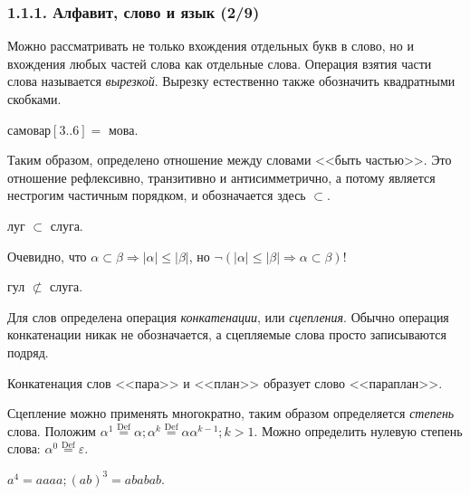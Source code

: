\documentclass[mathserif,12pt,aspectratio=169]{beamer}
\renewcommand{\index}[1]{}
\def\odmkey#1#2{{\it\color{red} #1}\index{#2}}
\def\Def{\stackrel{\text{Def}}{=}}
\let\Impl\Longrightarrow
\def\Not{\neg}
\let\le\leqslant
\begin{document}
\begin{frame}
\frametitle{1.1.1. Алфавит, слово и язык (2/9)}
Можно рассматривать не только вхождения
отдельных букв в слово, но и 
вхождения любых частей слова как отдельные слова.
Операция взятия части слова называется 
\odmkey{вырезкой}{Операция вырезки}.
Вырезку естественно также обозначить 
квадратными скобками. 
\begin{example}
самовар$[3..6]= $ мова.
\end{example}

Таким образом, определено отношение 
между словами <<быть частью>>.
Это отношение рефлексивно, транзитивно и антисимметрично,
а потому является нестрогим частичным порядком,
и обозначается здесь $\subset$.
\begin{example}
луг $\subset$ слуга.
\end{example}

\begin{remark} Очевидно, что 
$\alpha\subset\beta\Impl|\alpha|\le|\beta|$,
но $\Not(|\alpha|\le|\beta|\Impl\alpha\subset\beta)$!
\end{remark} 
\begin{example}
гул $\not\subset$ слуга.
\end{example}

Для слов определена операция 
\odmkey{конкатенации}{Операция!конкатенации}, 
или \odmkey{сцепления}{Операция!сцепления}.
Обычно операция конкатенации никак не обозначается, а сцепляемые слова 
просто записываются подряд. 

\begin{example}
Конкатенация слов <<пара>> и <<план>> образует слово <<параплан>>.
\end{example}

Сцепление можно применять многократно,
таким образом определяется \odmkey{степень}{Степень!слова} слова. Положим
$\alpha^1 \Def \alpha; \alpha^k\Def\alpha\alpha^{k-1}; k>1$. Можно 
определить нулевую степень слова:
$\alpha^0 \Def \varepsilon$.

\begin{example}
$a^4=aaaa; (ab)^3= ababab$.
\end{example}

\end{frame}
\end{document}
